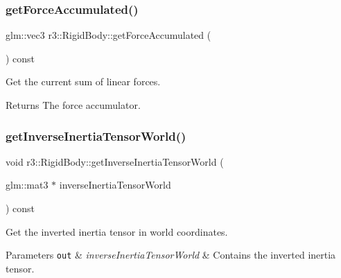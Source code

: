 \subsubsection{\texorpdfstring{get\+Force\+Accumulated()}{getForceAccumulated()}}
{\footnotesize\ttfamily glm\+::vec3 r3\+::\+Rigid\+Body\+::get\+Force\+Accumulated (\begin{DoxyParamCaption}{ }\end{DoxyParamCaption}) const}



Get the current sum of linear forces. 

\begin{DoxyReturn}{Returns}
The force accumulator. 
\end{DoxyReturn}
\mbox{\label{classr3_1_1_rigid_body_ae9057a0acbb7dd552a23557ed773b3d5}} 
\subsubsection{\texorpdfstring{get\+Inverse\+Inertia\+Tensor\+World()}{getInverseInertiaTensorWorld()}\hspace{0.1cm}{\footnotesize\ttfamily [1/2]}}
{\footnotesize\ttfamily void r3\+::\+Rigid\+Body\+::get\+Inverse\+Inertia\+Tensor\+World (\begin{DoxyParamCaption}\item[{glm\+::mat3 $\ast$}]{inverse\+Inertia\+Tensor\+World }\end{DoxyParamCaption}) const}



Get the inverted inertia tensor in world coordinates. 


\begin{DoxyParams}[1]{Parameters}
\mbox{\tt out}  & {\em inverse\+Inertia\+Tensor\+World} & Contains the inverted inertia tensor. \\
\hline
\end{DoxyParams}
\mbox{\label{classr3_1_1_rigid_body_a03c55eb4a0df2ec179e621ed5de0919a}} 
